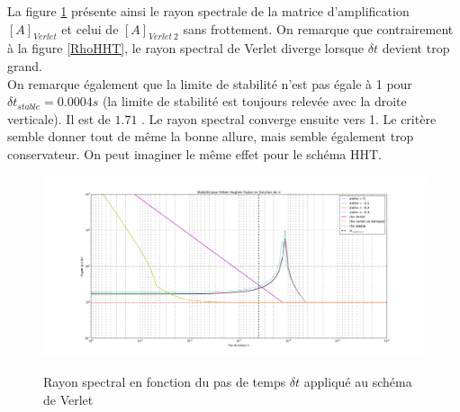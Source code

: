 \documentclass[11pt, a4paper]{article}
\begin{document}
La figure \ref{RhoVerlet} présente ainsi le rayon spectrale de la matrice d'amplification $[A]_{Verlet}$ et celui de $[A]_{Verlet \ 2}$ sans frottement. On remarque que contrairement à la figure \ref{RhoHHT}, le rayon spectral de Verlet diverge lorsque $\delta t$ devient trop grand. 
\\ 

On remarque également que la limite de stabilité n'est pas égale à 1 pour $\delta t_{stable} = 0.0004s$ (la limite de stabilité est toujours relevée avec la droite verticale). Il est de $1.71$ . Le rayon spectral converge ensuite vers 1. Le critère semble donner tout de même la bonne allure, mais semble également trop conservateur. On peut imaginer le même effet pour le schéma HHT.
\begin{figure}
	\centering
	\includegraphics[width=1\linewidth]{figures/Part5/RhoVerlet.png}
	\label{RhoVerlet}
	\caption{Rayon spectral en fonction du pas de temps $\delta t$ appliqué au schéma de Verlet}
\end{figure}
\end{document}
